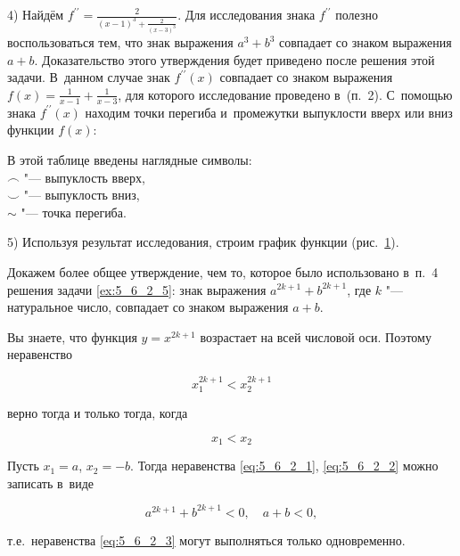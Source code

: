 4) Найдём
$\displaystyle f^{\prime\prime} = \frac{2}{(x - 1)^{3} + \frac{2}{(x - 3)^{3}}}$.
Для исследования знака $f^{\prime\prime}$ полезно воспользоваться тем,
что знак выражения $a^{3} + b^{3}$ совпадает со знаком выражения $a + b$.
Доказательство этого утверждения будет приведено после решения этой задачи.
В~данном случае знак $f^{\prime\prime} (x)$  совпадает со знаком выражения
$\displaystyle f(x) = \frac{1}{x - 1} + \frac{1}{x - 3}$,
для которого исследование проведено в~(п.~2).
С~помощью знака $f^{\prime\prime} (x)$ находим точки перегиба и~промежутки выпуклости
вверх или вниз функции $f(x)$:


В этой таблице введены наглядные символы:\\
$\frown$ "--- выпуклость вверх, \\
$\smile$ "--- выпуклость вниз, \\
$\sim$ "--- точка перегиба.

5) Используя результат исследования, строим график функции (рис.\ \ref{fig:5_6_2_17}).

\begin{figure}\label{fig:5_6_2_17}
\end{figure}

Докажем более общее утверждение, чем то, которое было использовано в~п.~4
решения задачи \ref{ex:5_6_2_5}: знак выражения $a^{2k+1} + b^{2k+1}$,
где $k$ "--- натуральное число, совпадает со знаком выражения $a + b$.

Вы знаете, что функция $y = x^{2k+1}$ возрастает на всей числовой оси.
Поэтому неравенство

\begin{equation}\label{eq:5_6_2_1}
x^{2k+1}_{1} < x^{2k+1}_{2}
\end{equation}

\noindent
верно тогда и только тогда, когда

\begin{equation}\label{eq:5_6_2_2}
x_{1} < x_{2}
\end{equation}

Пусть $x_{1} = a$, $x_{2} = -b$. Тогда неравенства \ref{eq:5_6_2_1}, \ref{eq:5_6_2_2}
можно записать в~виде

\begin{equation}\label{eq:5_6_2_3}
a^{2k+1} + b^{2k+1} < 0, \quad a + b < 0,
\end{equation}

\noindent
т.е.\ неравенства \ref{eq:5_6_2_3} могут выполняться только одновременно.
